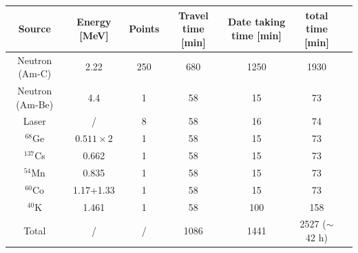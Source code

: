 \documentclass[a4paper,10pt,twoside]{cpc-hepnp}
\begin{document}
\begin{CJK*}{GB}{gbsn}
\begin{center}
   \footnotesize
	\begin{tabular*}{170mm}{@{\extracolsep{\fill}}ccccccc}
          \toprule  %
          Source&Energy [MeV]&  Points & Travel time [min] & Date taking time [min]&total time [min]\\ 
          \midrule  %
          Neutron (Am-C)  & 2.22  	   & 250&680 & 1250 & 1930\\
	  Neutron (Am-Be) & 4.4   	   & 1  & 58 & 15 & 73 \\
          Laser 	  & / 	  	   & 8  & 58 & 16 & 74 \\
          $^{68}$Ge 	  &$0.511 \times 2$& 1  & 58 & 15 & 73 \\
          $^{137}$Cs	  & 0.662 	   & 1  & 58 & 15 & 73 \\
          $^{54}$Mn 	  & 0.835 	   & 1  & 58 & 15 & 73 \\
          $^{60}$Co 	  & 1.17+1.33      & 1  & 58 & 15 & 73 \\
          $^{40}$K  	  & 1.461          & 1  & 58 &100 & 158 \\

          Total &/&/& 1086 & 1441 & 2527 ($\sim$ 42 h)\\
          \bottomrule  %
	\end{tabular*}
	\label{special_time}
\end{center}

\begin{multicols}{2}


\end{multicols}
\end{CJK*}
\end{document}
